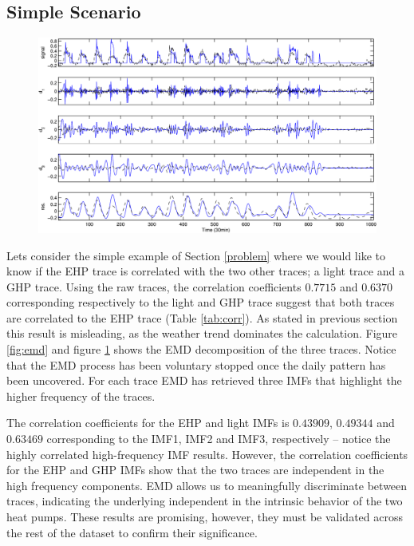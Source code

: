 \subsection{Simple Scenario}

\begin{figure}[tb]
\begin{center}
\includegraphics[width=\textwidth]{img/emd_25_41}
\caption{}
\label{fig:emd2}
\end{center}
\end{figure}

Lets consider the simple example of Section \ref{problem} where we would like to know if the EHP trace is correlated with the two other traces; a light trace and a GHP trace.
Using the raw traces, the correlation coefficients $0.7715$ and $0.6370$ corresponding respectively to the light and GHP trace suggest that both traces are correlated to the EHP trace (Table \ref{tab:corr}).
As stated in previous section this result is misleading, as the weather trend dominates the calculation.
Figure \ref{fig:emd} and figure \ref{fig:emd2} shows the EMD decomposition of the three traces.
Notice that the EMD process has been voluntary stopped once the daily pattern has been uncovered.
For each trace EMD has retrieved three IMFs that highlight the higher frequency of the traces.

The correlation coefficients for the EHP and light IMFs is $0.43909$, $0.49344$ and $0.63469$ corresponding  to the IMF1, IMF2 and IMF3, respectively -- notice the highly correlated high-frequency IMF results.
However, the correlation coefficients for the EHP and GHP IMFs show that the two traces are independent in the high frequency components.
EMD allows us to meaningfully discriminate between traces, indicating the underlying independent in the intrinsic
behavior of the two heat pumps.  These results are promising, however, they must be validated across the rest of the
dataset to confirm their significance.

